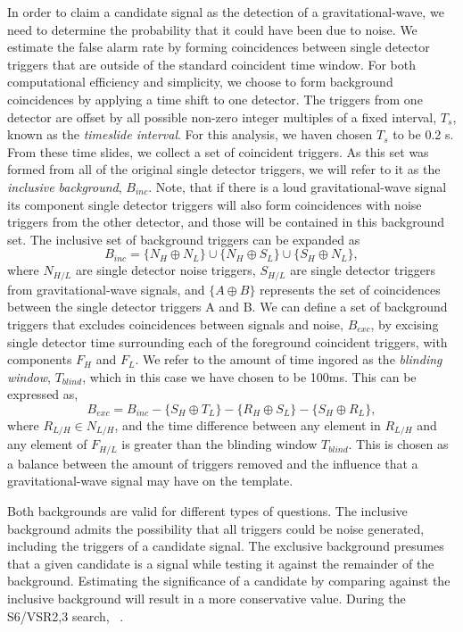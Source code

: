 In order to claim a candidate signal as the detection of a gravitational-wave, we need to determine the probability that it could have been due to noise. We estimate the false alarm rate by forming coincidences between single detector triggers that are outside of the standard coincident time window. For both computational efficiency and simplicity, we choose to form background coincidences by applying a time shift to one detector. The triggers from one detector are offset by all possible non-zero integer multiples of a fixed interval, $T_s$, known as the \emph{timeslide interval}. For this analysis, we haven chosen $T_s$ to be 0.2 s. From these time slides, we collect a set of coincident triggers. As this set was formed from all of the original single detector triggers, we will refer to it as the \textit{inclusive background}, $B_{inc}$. Note, that if there is a loud gravitational-wave signal its component single detector triggers will also form coincidences with noise triggers from the other detector, and those will be contained in this background set. The inclusive set of background triggers can be expanded as
%
\begin{equation}
B_{inc} = \{N_H \oplus N_L\} \cup \{ N_H \oplus S_L \} \cup \{S_H \oplus N_L\},
\end{equation}
where $N_{H/L}$ are single detector noise triggers, $S_{H/L}$ are single detector triggers from gravitational-wave signals, and $\{A \oplus B\}$ represents the set of coincidences between the single detector triggers A and B. We can define a set of background triggers that excludes coincidences between signals and noise, $B_{exc}$, by excising single detector time surrounding each of the foreground coincident triggers, with components $F_H$ and $F_L$. We refer to the amount of time ingored as the \emph{blinding window}, $T_{blind}$, which in this case we have chosen to be 100ms. This can be expressed as,
%
\begin{equation}
B_{exc} = B_{inc} - \{S_H \oplus T_L\} - \{R_H \oplus S_L\} - \{S_H \oplus R_L\},
\end{equation}
%
where $R_{L/H} \in N_{L/H}$, and the time difference between any element in $R_{L/H}$ and any element of $F_{H/L}$ is greater than the blinding window $T_{blind}$. This is chosen as a balance between the amount of triggers removed and the influence that a gravitational-wave signal may have on the template. 

Both backgrounds are valid for different types of questions. The inclusive background admits the possibility that all triggers could be noise generated, including the triggers of a candidate signal. The exclusive background presumes that a given candidate is a signal while testing it against the remainder of the background. Estimating the significance of a candidate by comparing against the inclusive background will result in a more conservative value. During the S6/VSR2,3 search, ~\cite{Collaboration:2011np}.

